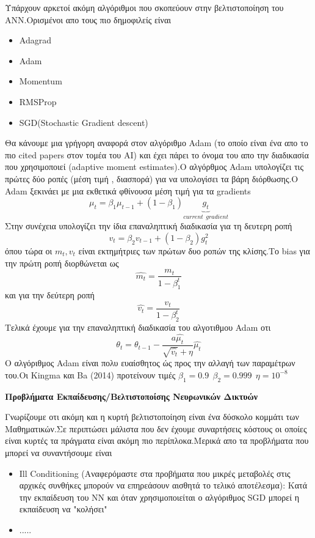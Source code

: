 \documentclass[12pt,a4paper]{article}
\begin{document}
Υπάρχουν αρκετοί ακόμη αλγόριθμοι που σκοπεύουν στην βελτιστοποίηση του ΑΝΝ.Ορισμένοι απο τους πιο δημοφιλείς είναι
\begin{itemize}
\item Adagrad
\item Adam
\item Momentum
\item RMSProp
\item SGD(Stochastic Gradient descent)
\end{itemize}

Θα κάνουμε μια γρήγορη αναφορά στον αλγόριθμο Adam (το οποίο είναι ένα απο το πιο cited papers στον τομέα του AI) και έχει πάρει το όνομα του απο την διαδικασία που χρησιμοποιεί (adaptive moment estimates).Ο αλγόρθμος Adam υπολογίζει τις πρώτες δύο ροπές (μέση τιμή , διασπορά) για να υπολογίσει τα βάρη διόρθωσης.O Adam ξεκινάει με μια εκθετικά φθίνουσα μέση τιμή για τα gradients
$$\mu_t = \beta_1 \mu_{t-1} +(1-\beta_1)\underbrace{g_t}_{current  \ \ gradient}$$
Στην συνέχεια υπολογίζει την ίδια επαναληπτική διαδικασία για τη δευτερη ροπή
$$v_t = \beta_2 v_{t-1} + (1-\beta_2) g_t^2$$
όπου τώρα οι $m_t , v_t$ είναι εκτημήτριες των πρώτων δυο ροπών της κλίσης.Το bias για την πρώτη ροπή διορθώνεται ως
$$\hat{m_t} = \frac{m_t}{1-\beta_1^t}$$
και για την δεύτερη ροπή
$$\hat{v_t} = \frac{v_t}{1-\beta_2^t}$$
Τελικά έχουμε για την επαναληπτική διαδικασία του αλγοτιθμου Adam οτι
$$\theta_t = \theta_{t-1} -\frac{a\hat{\mu_t}}{\sqrt{\hat{v_t}} +\eta}\hat{\mu_t}$$
Ο αλγόριθμος Adam είναι πολυ ευαίσθητος ώς προς την αλλαγή των παραμέτρων του.Οι Kingma και Ba (2014) προτείνουν τιμές $\beta_1 =0.9 \ \ \beta_2=0.999 \ \  \eta=10^{-8} $


\par {\textbf{Προβλήματα Εκπαίδευσης/Βελτιστοποίσης Νευρωνικών Δικτυών}}

\par Γνωρίζουμε οτι ακόμη και η κυρτή βελτιστοποίηση είναι ένα δύσκολο κομμάτι των Μαθηματικών.Σε περιπτώσει μάλιστα που δεν έχουμε συναρτήσεις κόστους οι οποίες είναι κυρτές τα πράγματα είναι ακόμη πιο περίπλοκα.Μερικά απο τα προβλήματα που μπορεί να συναντήσουμε είναι
\begin{itemize}
\item Ill Conditioning (Αναφερόμαστε στα προβήματα που μικρές μεταβολές στις αρχικές συνθήκες μπορούν να επηρεάσουν αισθητά το τελικό αποτέλεσμα): Κατά την εκπαίδευση του NN και όταν χρησιμοποιείται ο αλγόριθμος SGD μπορεί η εκπαίδευση να "κολήσει"
\item .....

\end{itemize}
\end{document}
